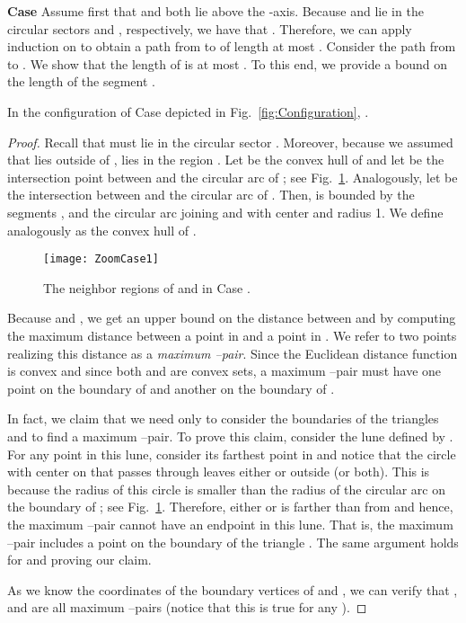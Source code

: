 \documentclass{cccg14}
\begin{document}
\textbf{Case } Assume first that  and  both lie above the -axis.
Because  and  lie in the circular sectors  and , respectively, we have that .
Therefore, we can apply induction on  to obtain a path  from  to  of length at most .
Consider the path  from  to . 
We show that the length of  is at most .
To this end, we provide a bound on the length of the segment .

\vspace{-0.5em}
\begin{lemma}\label{lemma:Case one maximized length}
In the configuration of Case  depicted in Fig.~\ref{fig:Configuration},
.
\end{lemma}
\vspace{-1em}
\begin{proof}
Recall that  must lie in the circular sector . Moreover,
because we assumed that  lies outside of ,  lies in the region . 
Let  be the convex hull of  and let  be the intersection point between  and the circular arc of ; see Fig.~\ref{fig:Neighbor regions Case 1}. Analogously, let  be the intersection between  and the circular arc of .
Then,  is bounded by the segments ,  and the circular arc joining  and  with center  and radius 1. We define  analogously as the convex hull of .

\begin{figure}[htb]
\centering
\texttt{[image: ZoomCase1]}
\caption{\small The neighbor regions of  and  in Case .}
\label{fig:Neighbor regions Case 1}
\vspace{-.1in}
\end{figure}

Because  and , we get an upper bound on the distance between  and  by computing the maximum distance between a point in  and a point in . We refer to two points realizing this distance as a  \emph{maximum --pair}.
Since the Euclidean distance function is convex and since both  and  are convex sets, a maximum --pair must have one point on the boundary of  and another on the boundary of .

In fact, we claim that we need only to consider the boundaries of the triangles  and  to find a maximum --pair.
To prove this claim, consider the lune defined by . For any point  in this lune, consider its farthest point  in  and notice that the circle with center on  that passes through  leaves either  or  outside (or both). This is because the radius of this circle is smaller than the radius of the circular arc on the boundary of ; see Fig.~\ref{fig:Neighbor regions Case 1}. Therefore, either  or  is farther than  from  and hence, the maximum --pair cannot have an endpoint in this lune. That is, the maximum --pair includes a point on the boundary of the triangle . The same argument holds for  and  proving our claim.

As we know the coordinates of the boundary vertices of  and , we can verify that 
,  and  are all 
maximum --pairs (notice that this is true for any ).
\end{proof}
\end{document}
